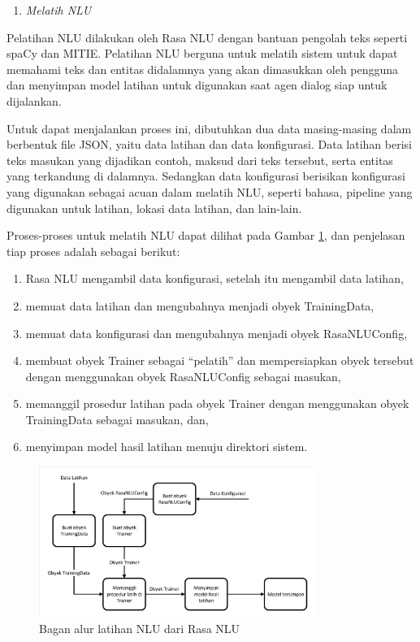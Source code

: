 \begin{enumerate}[label=\textit{\Alph*)}, itemindent=*, series=rasa_process_list]
	\item \textit{Melatih NLU}
\end{enumerate}

Pelatihan NLU dilakukan oleh Rasa NLU dengan bantuan pengolah teks seperti spaCy dan MITIE. Pelatihan NLU berguna untuk melatih sistem untuk dapat memahami teks dan entitas didalamnya yang akan dimasukkan oleh pengguna dan menyimpan model latihan untuk digunakan saat agen dialog siap untuk dijalankan.

Untuk dapat menjalankan proses ini, dibutuhkan dua data masing-masing dalam berbentuk file JSON, yaitu data latihan dan data konfigurasi. Data latihan berisi teks masukan yang dijadikan contoh, maksud dari teks tersebut, serta entitas yang terkandung di dalamnya. Sedangkan data konfigurasi berisikan konfigurasi yang digunakan sebagai acuan dalam melatih NLU, seperti bahasa, pipeline yang digunakan untuk latihan, lokasi data latihan, dan lain-lain.

Proses-proses untuk melatih NLU dapat dilihat pada Gambar \ref{fig:rasaNLU_train}, dan penjelasan tiap proses adalah sebagai berikut:

\begin{enumerate}
	\item Rasa NLU mengambil data konfigurasi, setelah itu mengambil data latihan,
	\item memuat data latihan dan mengubahnya menjadi obyek TrainingData,
	\item memuat data konfigurasi dan mengubahnya menjadi obyek RasaNLUConfig,
	\item membuat obyek Trainer sebagai “pelatih” dan mempersiapkan obyek tersebut dengan menggunakan obyek RasaNLUConfig sebagai masukan,
	\item memanggil prosedur latihan pada obyek Trainer dengan menggunakan obyek TrainingData sebagai masukan, dan,
	\item menyimpan model hasil latihan menuju direktori sistem.
\end{enumerate}

\begin{figure}[H]
	\centering
	\includegraphics[width=0.8\textwidth, trim=2 2 2 2, clip]{resources/3-rasaNLU_train.pdf}
	\caption{Bagan alur latihan NLU dari Rasa NLU}
	\label{fig:rasaNLU_train}
\end{figure}

